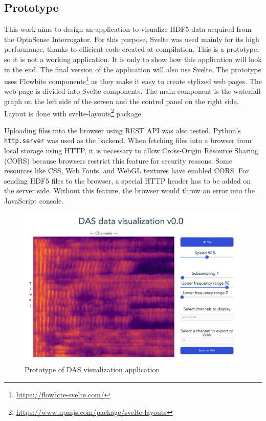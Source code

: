 \subsection{Prototype}

This work aims to design an application to visualize HDF5 data acquired from the OptaSense Interrogator. For this purpose, Svelte was used mainly for its high performance, thanks to efficient code created at compilation. This is a prototype, so it is not a working application. It is only to show how this application will look in the end. The final version of the application will also use Svelte. The prototype uses Flowbite components\footnote{\url{https://flowbite-svelte.com/}} as they make it easy to create stylized web pages. The web page is divided into Svelte components. The main component is the waterfall graph on the left side of the screen and the control panel on the right side. Layout is done with svelte-layouts\footnote{\url{https://www.npmjs.com/package/svelte-layouts}} package. 

Uploading files into the browser using REST API was also tested. Python's \verb|http.server| was used as the backend. When fetching files into a browser from local storage using HTTP, it is necessary to allow Cross-Origin Resource Sharing (CORS) because browsers restrict this feature for security reasons. Some resources like CSS, Web Fonts, and WebGL textures have enabled CORS. For sending HDF5 files to the browser, a special HTTP header has to be added on the server side. Without this feature, the browser would throw an error into the JavaScript console.

\begin{figure}
    \centering
    \includegraphics[width=\linewidth]{obrazky/svelte_prototype.png}
    \caption{Prototype of DAS visualization application}
    \label{fig:prototypesvelte}
\end{figure}
